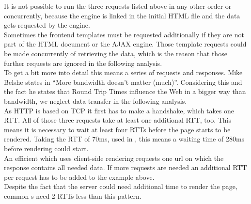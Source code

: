 \noindent{}It is not possible to run the three requests listed above in any other order or concurrently, because the \ajax{} engine is linked in the initial HTML file and the data gets requested by the \ajax{} engine.
\\
Sometimes the frontend templates must be requested additionally if they are not part of the HTML document or the AJAX engine.
Those template requests could be made concurrently of retrieving the data, which is the reason that those further requests are ignored in the following analysis.
\\
To get a bit more into detail this means a series of requests and responses.
Mike Belshe states in \cite{belshe2010more} \enquote{More bandwidth doesn't matter (much)}.
Considering this and the fact he states that Round Trip Times influence the Web in a bigger way than bandwidth, we neglect data transfer in the following analysis.
\\
As HTTP is based on TCP it first has to make a handshake, which takes one RTT.
All of those three requests take at least one additional RTT, too.
This means it is necessary to wait at least four RTTs before the page starts to be rendered.
Taking the RTT of 70ms, used in \cite{spero1994analysis}, this means a waiting time of 280ms before rendering could start.
\\
An efficient \webApplication{} which uses client-side rendering requests one url on which the response contains all needed data.
If more requests are needed an additional RTT per request has to be added to the example above.
\\
Despite the fact that the server could need additional time to render the page, common \httpRequest{}s need 2 RTTs less than this pattern.

